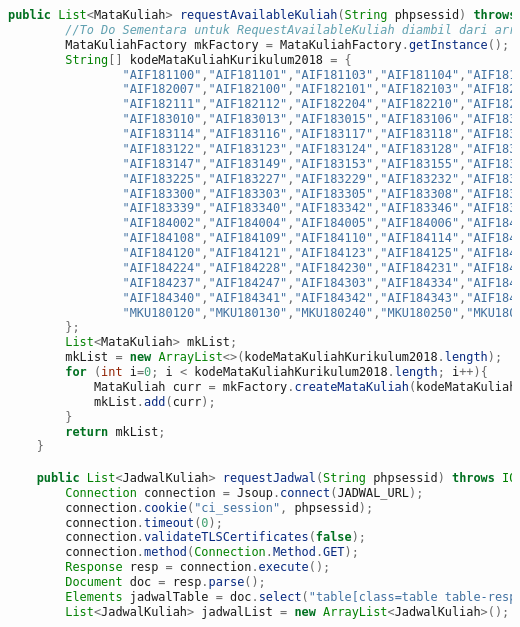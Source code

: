 \begin{lstlisting}[language=Java,basicstyle=\tiny,caption=Scraper.java]
	public List<MataKuliah> requestAvailableKuliah(String phpsessid) throws IOException {
		//To Do Sementara untuk RequestAvailableKuliah diambil dari array daftar mata kuliah 2018
		MataKuliahFactory mkFactory = MataKuliahFactory.getInstance();
		String[] kodeMataKuliahKurikulum2018 = {
				"AIF181100","AIF181101","AIF181103","AIF181104","AIF181105","AIF181106","AIF181107",
				"AIF182007","AIF182100","AIF182101","AIF182103","AIF182105","AIF182106","AIF182109",
				"AIF182111","AIF182112","AIF182204","AIF182210","AIF182302","AIF182308","AIF183002",
				"AIF183010","AIF183013","AIF183015","AIF183106","AIF183107","AIF183111","AIF183112",
				"AIF183114","AIF183116","AIF183117","AIF183118","AIF183119","AIF183120","AIF183121",
				"AIF183122","AIF183123","AIF183124","AIF183128","AIF183141","AIF183143","AIF183145",
				"AIF183147","AIF183149","AIF183153","AIF183155","AIF183201","AIF183204","AIF183209",
				"AIF183225","AIF183227","AIF183229","AIF183232","AIF183236","AIF183238","AIF183250",
				"AIF183300","AIF183303","AIF183305","AIF183308","AIF183331","AIF183333","AIF183337",
				"AIF183339","AIF183340","AIF183342","AIF183346","AIF183348","AIF184000","AIF184001",
				"AIF184002","AIF184004","AIF184005","AIF184006","AIF184007","AIF184104","AIF184106",
				"AIF184108","AIF184109","AIF184110","AIF184114","AIF184115","AIF184116","AIF184119",
				"AIF184120","AIF184121","AIF184123","AIF184125","AIF184127","AIF184129","AIF184222",
				"AIF184224","AIF184228","AIF184230","AIF184231","AIF184232","AIF184233","AIF184235",
				"AIF184237","AIF184247","AIF184303","AIF184334","AIF184336","AIF184338","AIF184339",
				"AIF184340","AIF184341","AIF184342","AIF184343","AIF184344","AIF184345","MKU180110",
				"MKU180120","MKU180130","MKU180240","MKU180250","MKU180370","MKU180380"
		};
		List<MataKuliah> mkList;
		mkList = new ArrayList<>(kodeMataKuliahKurikulum2018.length);
		for (int i=0; i < kodeMataKuliahKurikulum2018.length; i++){
			MataKuliah curr = mkFactory.createMataKuliah(kodeMataKuliahKurikulum2018[i]);
			mkList.add(curr);
		}
		return mkList;
	}

	public List<JadwalKuliah> requestJadwal(String phpsessid) throws IOException {
		Connection connection = Jsoup.connect(JADWAL_URL);
		connection.cookie("ci_session", phpsessid);
		connection.timeout(0);
		connection.validateTLSCertificates(false);
		connection.method(Connection.Method.GET);
		Response resp = connection.execute();
		Document doc = resp.parse();
		Elements jadwalTable = doc.select("table[class=table table-responsive table-hover d-md-table ]");
		List<JadwalKuliah> jadwalList = new ArrayList<JadwalKuliah>();


\end{lstlisting}
